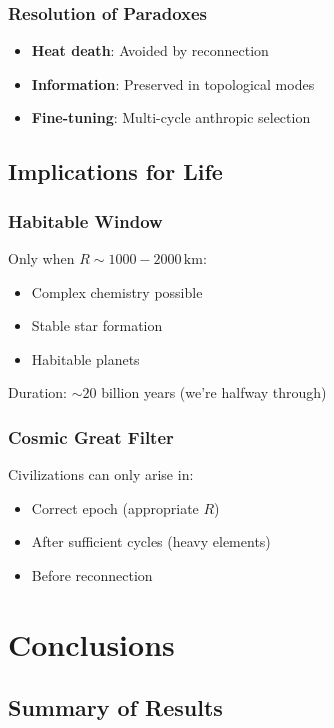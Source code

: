 \documentclass[12pt,a4paper]{article}
\begin{document}
\subsubsection{Resolution of Paradoxes}

\begin{itemize}
    \item \textbf{Heat death}: Avoided by reconnection
    \item \textbf{Information}: Preserved in topological modes
    \item \textbf{Fine-tuning}: Multi-cycle anthropic selection
\end{itemize}

\subsection{Implications for Life}

\subsubsection{Habitable Window}

Only when $R \sim 1000-2000\,\mathrm{km}$:
\begin{itemize}
    \item Complex chemistry possible
    \item Stable star formation
    \item Habitable planets
\end{itemize}

Duration: $\sim 20$ billion years (we're halfway through)

\subsubsection{Cosmic Great Filter}

Civilizations can only arise in:
\begin{itemize}
    \item Correct epoch (appropriate $R$)
    \item After sufficient cycles (heavy elements)
    \item Before reconnection
\end{itemize}

\section{Conclusions}
\label{sec:conclusions}

\subsection{Summary of Results}
\end{document}

